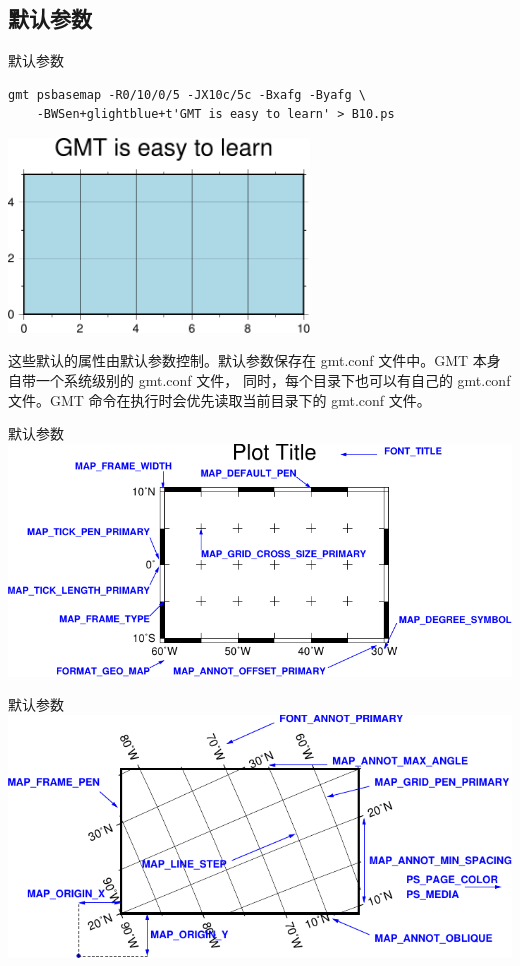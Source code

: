 \documentclass[UTF8, 11pt]{ctexbeamer}
\begin{document}
\subsection{默认参数}
\begin{frame}[fragile]{默认参数}
\centering
\small\begin{verbatim}
gmt psbasemap -R0/10/0/5 -JX10c/5c -Bxafg -Byafg \
    -BWSen+glightblue+t'GMT is easy to learn' > B10.ps
\end{verbatim}
\includegraphics[width=0.6\textwidth]{GMT_B_example_10}

这些默认的属性由默认参数控制。默认参数保存在 gmt.conf 文件中。GMT 本身自带一个系统级别的 gmt.conf 文件，
同时，每个目录下也可以有自己的 gmt.conf 文件。GMT 命令在执行时会优先读取当前目录下的 gmt.conf 文件。
\end{frame}
\begin{frame}{默认参数}
\includegraphics[width=\textwidth]{GMT_Defaults_1}
\end{frame}
\begin{frame}{默认参数}
\includegraphics[width=\textwidth]{GMT_Defaults_2}
\end{frame}
\end{document}
